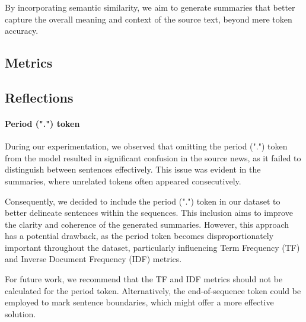 By incorporating semantic similarity, we aim to generate summaries that better capture the overall meaning and context of the source text, beyond mere token accuracy.

\subsection{Metrics}

\subsection{Reflections}
\paragraph{Period (".") token}
During our experimentation, we observed that omitting the period (".") token from the model resulted in significant confusion in the source news, as it failed to distinguish between sentences effectively. This issue was evident in the summaries, where unrelated tokens often appeared consecutively.

Consequently, we decided to include the period (".") token in our dataset to better delineate sentences within the sequences. This inclusion aims to improve the clarity and coherence of the generated summaries. However, this approach has a potential drawback, as the period token becomes disproportionately important throughout the dataset, particularly influencing Term Frequency (TF) and Inverse Document Frequency (IDF) metrics.

For future work, we recommend that the TF and IDF metrics should not be calculated for the period token. Alternatively, the end-of-sequence token could be employed to mark sentence boundaries, which might offer a more effective solution.
